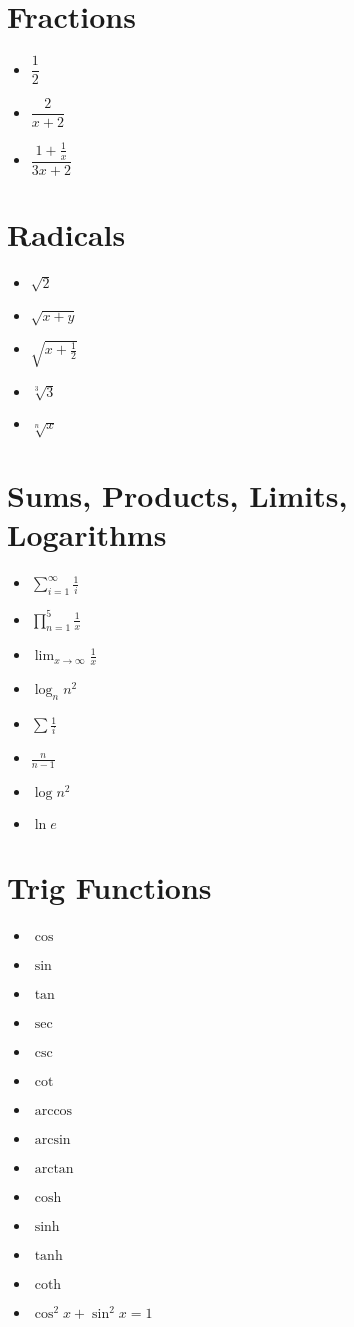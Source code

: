 \documentclass[11pt]{article}  %
\begin{document}
\section*{Fractions}
\begin{itemize}
\item $\dfrac{1}{2}$
\item $\dfrac{2}{x+2}$
\item $\dfrac{1+ \frac{1}{x}}{3x+2}$
\end{itemize}

\section*{Radicals}
\begin{itemize}
\item $\sqrt{2}$
\item $\sqrt{x+y}$
\item $\sqrt{x+\frac{1}{2}}$
\item $\sqrt[3]{3}$
\item $\sqrt[n]{x}$
\end{itemize}

\section*{Sums, Products, Limits, Logarithms}
\begin{itemize}
\item $\sum_{i=1}^{\infty}\frac{1}{i}$
\item $\prod_{n=1}^5\frac{1}{x}$
\item $\lim_{x\to\infty}\frac{1}{x}$
\item $\log_n n^2$
\item $\sum\frac{1}{i}$
\item $\frac{n}{n-1}$
\item $\log n^2$
\item $\ln e$
\end{itemize}

\section*{Trig Functions}
\begin{itemize}
\item $\cos$
\item $\sin$
\item $\tan$
\item $\sec$
\item $\csc$
\item $\cot$
\item $\arccos$
\item $\arcsin$
\item $\arctan$
\item $\cosh$
\item $\sinh$
\item $\tanh$
\item $\coth$
\item $\cos^2 x + \sin^2 x = 1$
\end{itemize}
\end{document}
